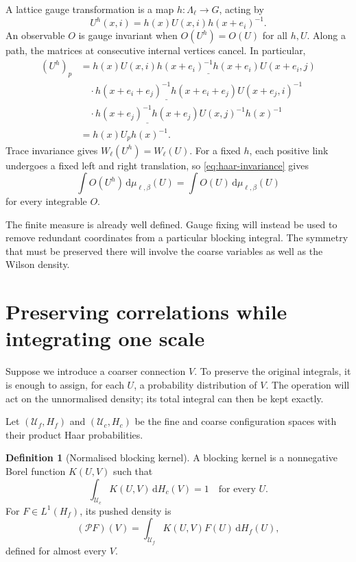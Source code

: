 \documentclass[11pt,reqno]{amsart}
\numberwithin{equation}{section}
\theoremstyle{definition}
\newtheorem{definition}[theorem]{Definition}
\theoremstyle{remark}
\newcommand{\dd}{\mathrm d}
\begin{document}
A lattice gauge transformation is a map \(h:\Lambda_\ell\to G\),
acting by
\begin{equation}
             U^h(x,i)=h(x)U(x,i)h(x+e_i)^{-1}.
 \label{eq:gauge}
\end{equation}
An observable \(O\) is gauge invariant when \(O(U^h)=O(U)\) for all
\(h,U\). Along a path, the matrices at consecutive internal vertices
cancel. In particular,
\begin{align*}
 (U^h)_p
 &=h(x)U(x,i)\underline{h(x+e_i)^{-1}h(x+e_i)}
       U(x+e_i,j)\\
 &\quad\cdot\underline{h(x+e_i+e_j)^{-1}h(x+e_i+e_j)}
       U(x+e_j,i)^{-1}\\
 &\quad\cdot\underline{h(x+e_j)^{-1}h(x+e_j)}
       U(x,j)^{-1}h(x)^{-1}\\
 &=h(x)U_ph(x)^{-1}.
\end{align*}
Trace invariance gives \(W_\ell(U^h)=W_\ell(U)\). For a fixed
\(h\), each positive link undergoes a fixed left and right
translation, so \eqref{eq:haar-invariance} gives
\begin{equation}
 \int O(U^h)\,\dd\mu_{\ell,\beta}(U)
                    =\int O(U)\,\dd\mu_{\ell,\beta}(U)
 \label{eq:measure-invariance}
\end{equation}
for every integrable \(O\).

The finite measure is already well defined. Gauge fixing will instead
be used to remove redundant coordinates from a particular blocking
integral. The symmetry that must be preserved there will involve the
coarse variables as well as the Wilson density.

\section{Preserving correlations while integrating one scale}
\label{sec:transport}

Suppose we introduce a coarser connection \(V\). To preserve the
original integrals, it is enough to assign, for each \(U\), a
probability distribution of \(V\). The operation will act on the
unnormalised density; its total integral can then be kept exactly.

Let \((\mathcal U_f,H_f)\) and \((\mathcal U_c,H_c)\) be the fine
and coarse configuration spaces with their product Haar probabilities.

\begin{definition}[Normalised blocking kernel]
A blocking kernel is a nonnegative Borel function \(K(U,V)\) such that
\begin{equation}
                \int_{\mathcal U_c}K(U,V)\,\dd H_c(V)=1
                \quad\text{for every }U.
 \label{eq:kernel-normalisation}
\end{equation}
For \(F\in L^1(H_f)\), its pushed density is
\begin{equation}
         (\mathcal PF)(V)=\int_{\mathcal U_f}K(U,V)F(U)\,\dd H_f(U),
 \label{eq:push}
\end{equation}
defined for almost every \(V\).
\end{definition}
\end{document}
